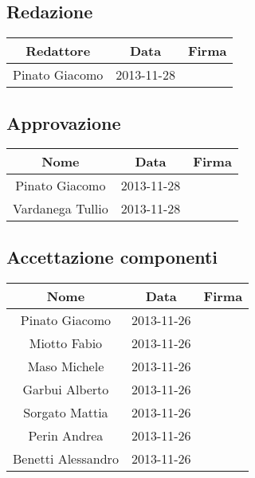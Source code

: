 \subsection{Redazione}%
\label{1.1}
\begin{center}
\begin{longtable}{|c|c|p{5cm}|}
\toprule
\textbf{Redattore} & \textbf{Data} & \textbf{Firma}\\
\midrule
Pinato Giacomo & 2013-11-28 & \\
\bottomrule
\end{longtable}
\end{center} 

\subsection{Approvazione}
\label{1.2}
\begin{center}
\begin{longtable}{|c|c|p{5cm}|}
\toprule
\textbf{Nome} & \textbf{Data} & \textbf{Firma}\\
\midrule
Pinato Giacomo & 2013-11-28 & \\
Vardanega Tullio & 2013-11-28 & \\
\bottomrule
\end{longtable}
\end{center} 

\subsection{Accettazione componenti}
\label{1.3}
\begin{center}
\begin{longtable}{|c|c|p{5cm}|}
\toprule
\textbf{Nome} & \textbf{Data} & \textbf{Firma}\\
\midrule
Pinato Giacomo & 2013-11-26 & \\
Miotto Fabio & 2013-11-26 & \\
Maso Michele & 2013-11-26 & \\
Garbui Alberto & 2013-11-26 & \\
Sorgato Mattia & 2013-11-26 & \\
Perin Andrea & 2013-11-26 & \\
Benetti Alessandro & 2013-11-26 & \\
\bottomrule
\end{longtable}
\end{center} 

